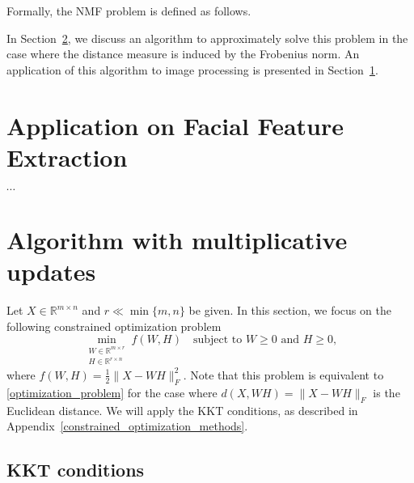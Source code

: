 \documentclass{amsart}
\newcommand{\R}{\mathbb{R}}
\begin{document}
Formally, the NMF problem is defined as follows.

\bigskip

\noindent{}

\bigskip

In Section~\ref{NMF_algorithm}, we discuss an algorithm to approximately solve this problem in the case where the distance measure is induced by the Frobenius norm. An application of this algorithm to image processing is presented in Section~\ref{facial_feature_extraction}.

\section{Application on Facial Feature Extraction} \label{facial_feature_extraction}

$\cdots$

\section{Algorithm with multiplicative updates} \label{NMF_algorithm}

Let $X\in\R^{m\times n}$ and $r \ll\min\{m,n\}$ be given. In this section, we focus on the following constrained optimization problem
\begin{equation}
    \label{optimization_problem_frobenius}
    \min_{\substack{W \in \mathbb{R}^{m \times r} \\ H \in \mathbb{R}^{r \times n}}} f(W,H) \quad \text{subject to } W \geq 0 \text{ and } H \geq 0,
\end{equation}
where $f(W,H)= \frac{1}{2} \|X-WH\|_F^2$. Note that this problem is equivalent to \eqref{optimization_problem} for the case where $d(X,WH)= \|X-WH\|_F$ is the Euclidean distance. We will apply the KKT conditions, as described in Appendix~\ref{constrained_optimization_methods}.

\subsection{KKT conditions}
\end{document}
